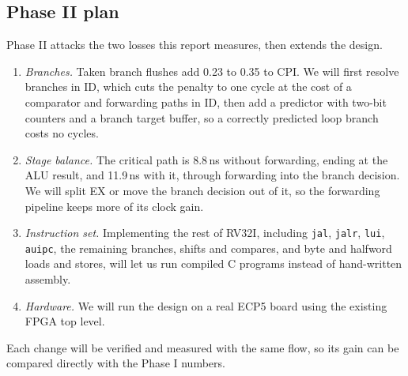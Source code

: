 \subsection{Phase II plan}
Phase II attacks the two losses this report measures, then extends the
design.
\begin{enumerate}
\item \emph{Branches.} Taken branch flushes add 0.23 to 0.35 to CPI. We will
first resolve branches in ID, which cuts the penalty to one cycle at the cost
of a comparator and forwarding paths in ID, then add a predictor with
two-bit counters \cite{smith1981} and a branch target buffer, so a correctly
predicted loop branch costs no cycles.
\item \emph{Stage balance.} The critical path is 8.8\,ns without forwarding,
ending at the ALU result, and 11.9\,ns with it, through forwarding into the
branch decision. We will split EX or move the branch decision out of it, so
the forwarding pipeline keeps more of its clock gain.
\item \emph{Instruction set.} Implementing the rest of RV32I, including
\texttt{jal}, \texttt{jalr}, \texttt{lui}, \texttt{auipc}, the remaining
branches, shifts and compares, and byte and halfword loads and stores, will
let us run compiled C programs instead of hand-written assembly.
\item \emph{Hardware.} We will run the design on a real ECP5 board using the
existing FPGA top level.
\end{enumerate}
Each change will be verified and measured with the same flow, so its gain can
be compared directly with the Phase I numbers.
